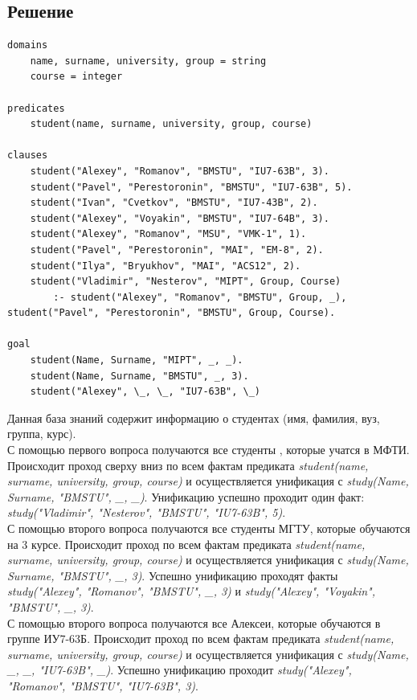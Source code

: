 \documentclass[12pt]{report}
\begin{document}
\subsection*{Решение}
\begin{lstlisting}
domains 
	name, surname, university, group = string
	course = integer

predicates
	student(name, surname, university, group, course)

clauses
	student("Alexey", "Romanov", "BMSTU", "IU7-63B", 3).
	student("Pavel", "Perestoronin", "BMSTU", "IU7-63B", 5).
	student("Ivan", "Cvetkov", "BMSTU", "IU7-43B", 2).
	student("Alexey", "Voyakin", "BMSTU", "IU7-64B", 3).
	student("Alexey", "Romanov", "MSU", "VMK-1", 1).
	student("Pavel", "Perestoronin", "MAI", "EM-8", 2).
	student("Ilya", "Bryukhov", "MAI", "ACS12", 2).
	student("Vladimir", "Nesterov", "MIPT", Group, Course) 
		:- student("Alexey", "Romanov", "BMSTU", Group, _),  student("Pavel", "Perestoronin", "BMSTU", Group, Course).

goal
	student(Name, Surname, "MIPT", _, _).
	student(Name, Surname, "BMSTU", _, 3).
	student("Alexey", \_, \_, "IU7-63B", \_)
\end{lstlisting}

Данная база знаний содержит информацию о студентах (имя, фамилия, вуз, группа, курс).\\

С помощью первого вопроса получаются все студенты , которые учатся в МФТИ. Происходит проход сверху вниз по всем фактам предиката \emph{student(name, surname, university, group, course)} и осуществляется унификация с \emph{study(Name, Surname, "BMSTU"{}, \_, \_)}. Унификацию успешно проходит один факт: \emph{study("Vladimir"{}, "Nesterov"{}, "BMSTU"{}, "IU7-63B"{}, 5)}.\\

С помощью второго вопроса получаются все студенты МГТУ, которые обучаются на 3 курсе.  Происходит проход по всем фактам предиката \emph{student(name, surname, university, group, course)} и осуществляется унификация с \emph{study(Name, Surname, "BMSTU"{}, \_, 3)}.  Успешно унификацию проходят факты \emph{study("Alexey"{}, "Romanov"{}, "BMSTU"{}, \_, 3)} и \emph{study("Alexey"{}, "Voyakin"{}, "BMSTU"{}, \_, 3)}.\\

С помощью второго вопроса получаются все Алексеи, которые обучаются в группе ИУ7-63Б.  Происходит проход по всем фактам предиката \emph{student(name, surname, university, group, course)} и осуществляется унификация с \emph{study(Name, \_, \_, "IU7-63B"{}, \_)}.  Успешно унификацию проходит \emph{study("Alexey"{}, "Romanov"{}, "BMSTU"{}, "IU7-63B"{}, 3)}.\\


















	
\end{document}
